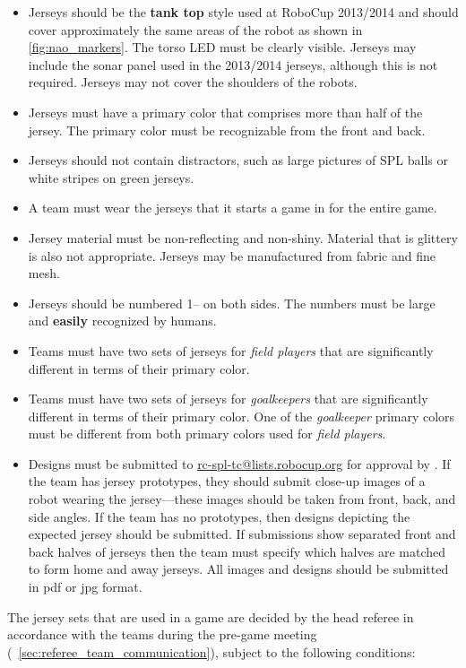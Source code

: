 \begin{itemize}
  \item Jerseys should be the \textbf{tank top} style used at RoboCup 2013/2014 and should cover approximately the same areas of the robot as shown in \cref{fig:nao_markers}.
    The torso LED must be clearly visible.
    Jerseys may include the sonar panel used in the 2013/2014 jerseys, although this is not required.
    Jerseys may not cover the shoulders of the robots.
  \item Jerseys must have a primary color that comprises more than half of the jersey.
    The primary color must be recognizable from the front and back.
  \item Jerseys should not contain distractors, such as large pictures of SPL balls or white stripes on green jerseys.
  \item A team must wear the jerseys that it starts a game in for the entire game.
  \item Jersey material must be non-reflecting and non-shiny.
    Material that is glittery is also not appropriate.
    Jerseys may be manufactured from fabric and fine mesh.
  \item Jerseys should be numbered 1--{\MaxJerseyNumber} on both sides.
    The numbers must be large and {\bf easily} recognized by humans.
  \item Teams must have two sets of jerseys for \emph{field players} that are significantly different in terms of their primary color.
  \item Teams must have two sets of jerseys for \emph{goalkeepers} that are significantly different in terms of their primary color.
    One of the \emph{goalkeeper} primary colors must be different from both primary colors used for \emph{field players}.
  \item Designs must be submitted to \url{rc-spl-tc@lists.robocup.org} for approval by \DTMdate{\JerseyApproveSubmissionDate}.
    If the team has jersey prototypes, they should submit close-up images of a robot wearing the jersey---these images should be taken from front, back, and side angles.
    If the team has no prototypes, then designs depicting the expected jersey should be submitted.
    If submissions show separated front and back halves of jerseys then the team must specify which halves are matched to form home and away jerseys.
    All images and designs should be submitted in pdf or jpg format.
\end{itemize}

The jersey sets that are used in a game are decided by the head referee in accordance with the teams during the pre-game meeting (\cf~\cref{sec:referee_team_communication}), subject to the following conditions:

